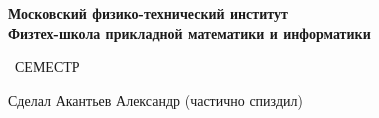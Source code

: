 \begin{titlepage}
	\clearpage\thispagestyle{empty}
	\centering
	
	\textbf{Московский физико-технический институт \\ Физтех-школа прикладной математики и информатики}
	\vspace{33ex}
	
	{\textbf{\FullCourseNameFirstPart}}
	
	\SemesterNumber\ СЕМЕСТР  
	\vspace{1ex}
	

	\begin{flushright}
		\noindent
		Сделал Акантьев Александр (частично спиздил)
	\end{flushright}
	
	\vfill
	\CourseDate
	\pagebreak
\end{titlepage}
